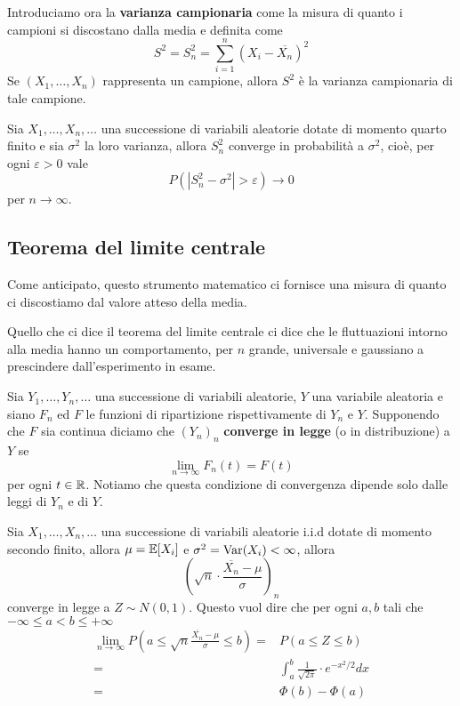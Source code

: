 Introduciamo ora la \textbf{varianza campionaria} come la misura di quanto i campioni si
discostano dalla media e definita come
\[ S^2 = S_n^2 = \sum_{i=1}^n \left( X_i - \overline{X_n} \right)^2 \]
Se $(X_1, \dots, X_n)$ rappresenta un campione, allora $S^2$ è la varianza campionaria di tale
campione.

\begin{proposition}
	Sia $X_1, \dots, X_n, \dots$ una successione di variabili aleatorie dotate di momento quarto
	finito e sia $\sigma^2$ la loro varianza, allora $S_n^2$ converge in probabilità a $\sigma^2$,
	cioè, per ogni $\varepsilon > 0$ vale
	\[ P(|S_n^2 - \sigma^2| > \varepsilon) \to 0 \]
	per $n \to \infty$.
\end{proposition}

\subsection{Teorema del limite centrale}
Come anticipato, questo strumento matematico ci fornisce una misura di quanto ci discostiamo dal
valore atteso della media.

Quello che ci dice il teorema del limite centrale ci dice che le fluttuazioni intorno alla media
hanno un comportamento, per $n$ grande, universale e gaussiano a prescindere dall'esperimento in
esame.

\begin{definition}
	Sia $Y_1, \dots, Y_n, \dots$ una successione di variabili aleatorie, $Y$ una variabile
	aleatoria e siano $F_n$ ed $F$ le funzioni di ripartizione rispettivamente di $Y_n$ e $Y$.
	Supponendo che $F$ sia continua diciamo che $(Y_n)_n$ \textbf{converge in legge} (o in
	distribuzione) a $Y$ se
	\[ \lim_{n \to \infty} F_n (t) = F(t) \]
	per ogni $t \in \mathbb{R}$. Notiamo che questa condizione di convergenza dipende solo dalle leggi di
	$Y_n$ e di $Y$.
\end{definition}

\begin{theorem}\label{th: tlc}
	Sia $X_1, \dots, X_n, \dots$ una successione di variabili aleatorie i.i.d dotate di momento
	secondo finito, allora $\mu = \mathbb{E}[X_i]$ e $\sigma^2 = \operatorname{Var}(X_i) < \infty$, allora
	\[ \left( \sqrt{n} \cdot \frac{\overline{X_n} - \mu}{\sigma} \right)_n \]
	converge in legge a $Z \sim N(0,1)$. Questo vuol dire che per ogni $a, b$ tali che
	$-\infty \leq a < b \leq +\infty$
	\begin{align*}
		\lim_{n \to \infty} P\left( a \leq \sqrt{n} \frac{\overline{X_n} -
		\mu}{\sigma} \leq b \right) = & P(a \leq Z \leq b)                                      \\
		=                             & \int_{a}^{b} \frac{1}{\sqrt{2 \pi}} \cdot e^{-x^2/2} dx \\
		=                             & \Phi(b) - \Phi(a)
	\end{align*}
\end{theorem}

